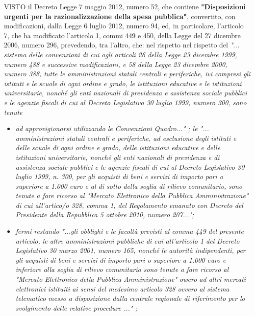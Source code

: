 \begin{list}{VALUTATA}{}
\item[VISTO]
il Decreto Legge 7 maggio 2012,  numero 52,  che contiene \textbf{"Disposizioni urgenti per la
razionalizzazione della spesa pubblica"}, convertito, con modificazioni, dalla Legge 6 luglio 2012,
numero 94, ed, in particolare, l'articolo 7, che ha modificato l'articolo 1, commi 449 e 450, della
Legge del 27 dicembre 2006, numero 296, prevedendo, tra l'altro, che: nel rispetto nel rispetto del
\textit{"... sistema delle convenzioni di cui agli articoli 26 della Legge 23 dicembre 1999, numero 488
e successive modificazioni, e 58 della Legge 23 dicembre 2000, numero 388, tutte le amministrazioni
statali centrali e periferiche, ivi compresi gli istituti e le scuole di ogni ordine e grado, le istituzioni
educative e le istituzioni universitarie, nonché gli enti nazionali di previdenza e assistenza sociale
pubblici e le agenzie fiscali di cui al Decreto Legislativo  30 luglio 1999,  numero 300, sono  tenute}
\begin{itemize}
\item \textit{ad approvigionarsi utilizzando le Convenzioni Quadro..." ; le "... amministrazioni statali centrali
e periferiche, ad esclusione degli istituti e delle scuole di ogni ordine e grado, delle istituzioni
educative e delle istituzioni universitarie, nonché gli enti nazionali di previdenza e di assistenza sociale
pubblici e le agenzie fiscali di cui al Decreto Legislativo 30 luglio 1999, n. 300, per gli acquisti di beni
e servizi di importo pari o superiore a 1.000 euro e al di sotto della soglia di rilievo comunitario, sono
tenute a fare ricorso al "Mercato Elettronico della Pubblica Amministrazione" di cui all'artico/o 328,
comma 1, del Regolamento emanato con Decreto del Presidente della Repubblica 5 ottobre 2010, numero 207...";}

\item \textit{fermi restando "...gli obblighi e le facoltà previsti al comma 449 del presente articolo, le altre
amministrazioni pubbliche di cui all'articolo 1 del Decreto Legislativo 30 marzo 2001, numero 165, nonché
le autorità indipendenti, per gli acquisti di beni  e servizi di importo pari o superiore a 1.000 euro e
inferiore alla soglia di rilievo comunitario sono tenute a fare ricorso al "Mercato Elettronico della
Pubblica  Amministrazione" owero ad altri mercati elettronici istituiti ai sensi del medesimo articolo 328
ovvero  al sistema  telematico  messo a disposizione dalla centrale regionale di riferimento per lo
svolgimento delle relative procedure ..." ;}
\end{itemize}


\end{list}
